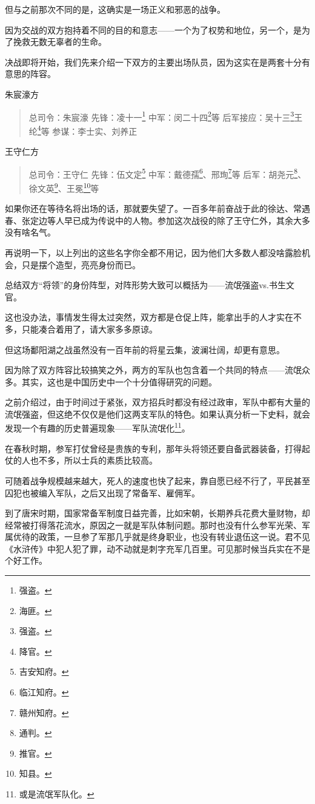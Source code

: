 \begin{multicols}{\theparacolNo}
但与之前那次不同的是，这确实是一场正义和邪恶的战争。

因为交战的双方抱持着不同的目的和意志——一个为了权势和地位，另一个，是为了挽救无数无辜者的生命。

决战即将开始，我们先来介绍一下双方的主要出场队员，因为这实在是两套十分有意思的阵容。

朱宸濠方
{\footnotesize \begin{quote}
	总司令：朱宸濠
	先锋：凌十一\footnote{强盗。}
	中军：闵二十四\footnote{海匪。}等
	后军接应：吴十三\footnote{强盗。}王纶\footnote{降官。}等
	参谋：李士实、刘养正
\end{quote}}

王守仁方
{\footnotesize \begin{quote}
	总司令：王守仁
	先锋：伍文定\footnote{吉安知府。}
	中军：戴德孺\footnote{临江知府。}、邢珣\footnote{赣州知府。}等
	后军：胡尧元\footnote{通判。}、徐文英\footnote{推官。}、王冕\footnote{知县。}等
\end{quote}}

如果你还在等待名将出场的话，那就要失望了。一百多年前奋战于此的徐达、常遇春、张定边等人早已成为传说中的人物。参加这次战役的除了王守仁外，其余大多没有啥名气。

再说明一下，以上列出的这些名字你全都不用记，因为他们大多数人都没啥露脸机会，只是摆个造型，亮亮身份而已。

总结双方“将领”的身份阵型，对阵形势大致可以概括为——流氓强盗vs.书生文官。

这也没办法，事情发生得太过突然，双方都是仓促上阵，能拿出手的人才实在不多，只能凑合着用了，请大家多多原谅。

但这场鄱阳湖之战虽然没有一百年前的将星云集，波澜壮阔，却更有意思。

因为除了双方阵容比较搞笑之外，两方的军队也包含着一个共同的特点——流氓众多。其实，这也是中国历史中一个十分值得研究的问题。

之前介绍过，由于时间过于紧张，双方招兵时都没有经过政审，军队中都有大量的流氓强盗，但这绝不仅仅是他们这两支军队的特色。如果认真分析一下史料，就会发现一个有趣的历史普遍现象——军队流氓化\footnote{或是流氓军队化。}。

在春秋时期，参军打仗曾经是贵族的专利，那年头将领还要自备武器装备，打得起仗的人也不多，所以士兵的素质比较高。

可随着战争规模越来越大，死人的速度也快了起来，靠自愿已经不行了，平民甚至囚犯也被编入军队，之后又出现了常备军、雇佣军。

到了唐宋时期，国家常备军制度日益完善，比如宋朝，长期养兵花费大量财物，却经常被打得落花流水，原因之一就是军队体制问题。那时也没有什么参军光荣、军属优待的政策，一旦参了军那几乎就是终身职业，也没有转业退伍这一说。君不见《水浒传》中犯人犯了罪，动不动就是刺字充军几百里。可见那时候当兵实在不是个好工作。


\end{multicols}
